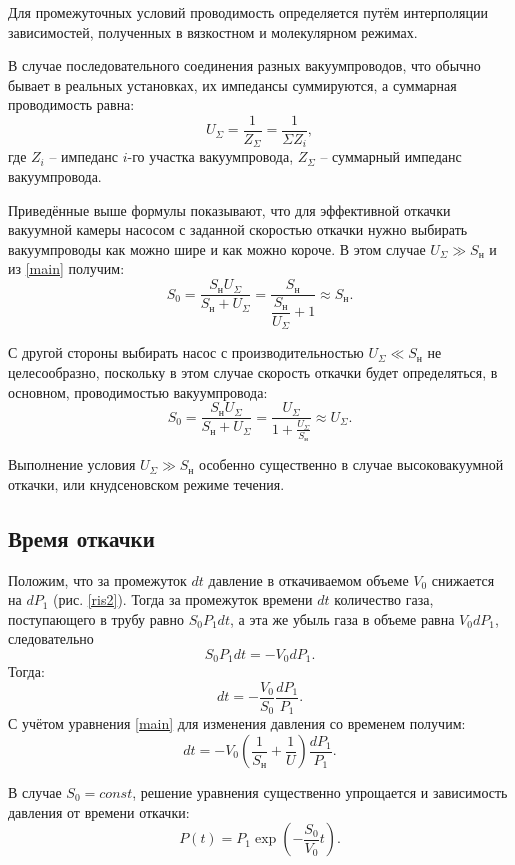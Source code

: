 \documentclass[a4paper, 12pt]{article}
\begin{document}
Для промежуточных условий проводимость определяется путём
интерполяции зависимостей, полученных в вязкостном и молекулярном
режимах.

В случае последовательного соединения разных вакуумпроводов,
что обычно бывает в реальных установках, их импедансы суммируются,
а суммарная проводимость равна:
\begin{equation}\label{u_sum}
U_{\Sigma} = \dfrac{1}{Z_{\Sigma}} = \dfrac{1}{\Sigma Z_i},
\end{equation}
где $Z_i$ -- импеданс $i$-го участка вакуумпровода, $Z_{\Sigma}$ -- суммарный импеданс вакуумпровода.

Приведённые выше формулы показывают, что для эффективной
откачки вакуумной камеры насосом с заданной скоростью откачки нужно
выбирать вакуумпроводы как можно шире и как можно короче. В этом
случае $U_{\Sigma} \gg S_н$ и из \eqref{main} получим:
\[S_0 = \dfrac{S_{\text{н}}U_{\Sigma}}{S_{\text{н}} + U_{\Sigma}} = \dfrac{S_{\text{н}}}{\dfrac{S_{\text{н}}}{U_{\Sigma}} + 1} \approx S_{\text{н}}.\]

С другой стороны выбирать насос с производительностью
$U_{\Sigma} \ll S_н$ не целесообразно, поскольку в этом случае скорость откачки будет определяться, в основном, проводимостью вакуумпровода:
\[S_0 = \dfrac{S_{\text{н}}U_{\Sigma}}{S_{\text{н}} + U_{\Sigma}} = \frac{U_{\Sigma}}{1 + \frac{U_{\Sigma}}{S_н}} \approx U_{\Sigma}.\]

Выполнение условия $U_{\Sigma} \gg S_н$ особенно существенно в случае высоковакуумной откачки, или кнудсеновском режиме течения.

\subsection{Время откачки}

Положим, что за промежуток $dt$ давление в откачиваемом объеме $V_0$ снижается на $dP_1$ (рис. \ref{ris2}). Тогда за промежуток времени $dt$ количество газа, поступающего в трубу равно $S_0 P_1 dt$, а эта же убыль газа в объеме равна $V_0 dP_1$, следовательно 
\[S_0 P_1 dt = -V_0 dP_1.\]
Тогда:
\[dt = -\dfrac{V_0}{S_0} \dfrac{dP_1}{P_1}.\]
С учётом уравнения \eqref{main} для изменения давления со временем получим:
\begin{equation}\label{kach_time1}
dt = -V_0 \left( \dfrac{1}{S_{ \text{н} }} + \dfrac{1}{U} \right) \dfrac{dP_1}{P_1}.
\end{equation}

В случае $S_0 = const$, решение уравнения существенно
упрощается и зависимость давления от времени откачки:
\begin{equation}\label{kach_time2}
P(t) = P_1 \exp \left( -\dfrac{S_0}{V_0} t \right).
\end{equation}
\end{document}

